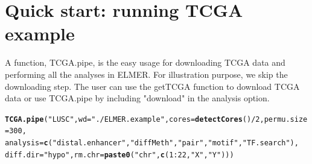 \documentclass{article}\usepackage[]{graphicx}\usepackage[usenames,dvipsnames]{color}
\makeatletter
\newcommand{\hlnum}[1]{\textcolor[rgb]{0.686,0.059,0.569}{#1}}%
\newcommand{\hlstr}[1]{\textcolor[rgb]{0.192,0.494,0.8}{#1}}%
\newcommand{\hlopt}[1]{\textcolor[rgb]{0,0,0}{#1}}%
\newcommand{\hlstd}[1]{\textcolor[rgb]{0.345,0.345,0.345}{#1}}%
\newcommand{\hlkwc}[1]{\textcolor[rgb]{0.333,0.667,0.333}{#1}}%
\newcommand{\hlkwd}[1]{\textcolor[rgb]{0.737,0.353,0.396}{\textbf{#1}}}%
\newenvironment{kframe}{%
 \def\at@end@of@kframe{}%
 \ifinner\ifhmode%
  \def\at@end@of@kframe{\end{minipage}}%
  \begin{minipage}{\columnwidth}%
 \fi\fi%
 \def\FrameCommand##1{\hskip\@totalleftmargin \hskip-\fboxsep
 \colorbox{shadecolor}{##1}\hskip-\fboxsep
     \hskip-\linewidth \hskip-\@totalleftmargin \hskip\columnwidth}%
 \MakeFramed {\advance\hsize-\width
   \@totalleftmargin\z@ \linewidth\hsize
   \@setminipage}}%
 {\par\unskip\endMakeFramed%
 \at@end@of@kframe}
\newenvironment{knitrout}{}{} %
\makeatother
\begin{document}
\section{Quick start: running TCGA example}
A function, TCGA.pipe, is the easy usage for downloading TCGA data and performing all 
the analyses in ELMER. For illustration purpose, we skip the downloading step. 
The user can use the getTCGA function to download TCGA data or
use TCGA.pipe by including "download" in the analysis option.

\begin{knitrout}
\color{fgcolor}\begin{kframe}
\begin{alltt}
\hlkwd{TCGA.pipe}\hlstd{(}\hlstr{"LUSC"}\hlstd{,}\hlkwc{wd}\hlstd{=}\hlstr{"./ELMER.example"}\hlstd{,}\hlkwc{cores}\hlstd{=}\hlkwd{detectCores}\hlstd{()}\hlopt{/}\hlnum{2}\hlstd{,}\hlkwc{permu.size}\hlstd{=}\hlnum{300}\hlstd{,}
          \hlkwc{analysis} \hlstd{=} \hlkwd{c}\hlstd{(}\hlstr{"distal.enhancer"}\hlstd{,}\hlstr{"diffMeth"}\hlstd{,}\hlstr{"pair"}\hlstd{,}\hlstr{"motif"}\hlstd{,}\hlstr{"TF.search"}\hlstd{),}
          \hlkwc{diff.dir}\hlstd{=}\hlstr{"hypo"}\hlstd{,}\hlkwc{rm.chr}\hlstd{=}\hlkwd{paste0}\hlstd{(}\hlstr{"chr"}\hlstd{,}\hlkwd{c}\hlstd{(}\hlnum{1}\hlopt{:}\hlnum{22}\hlstd{,}\hlstr{"X"}\hlstd{,}\hlstr{"Y"}\hlstd{)))}
\end{alltt}


{\ttfamily\noindent\itshape\color{messagecolor}{\#\# \#\#\#\#\#\#\#\#\#\#\#\#\#\#\#\#\#\#\#\\\#\# Select distal enhancer probes\\\#\# \#\#\#\#\#\#\#\#\#\#\#\#\#\#\#\#\#\#\#}}

{\ttfamily\noindent\color{warningcolor}{\#\# Warning in (function (probe, distal = TRUE, feature, TSS, TSS.range = list(upstream = 2000, : Default probes coordinates are for HM450K DNA methylation array}}


\end{kframe}
\end{knitrout}
\end{document}
